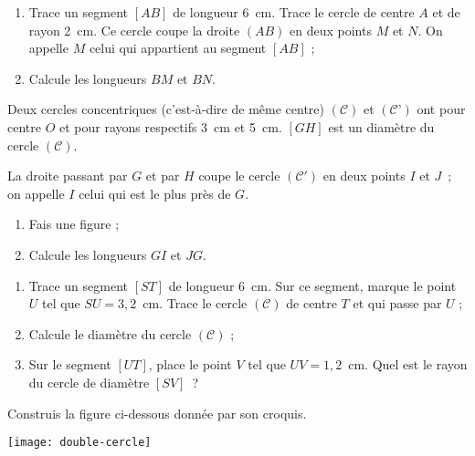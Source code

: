 \begin{exercice}[Calculs]
 \begin{enumerate}
  \item Trace un segment $[AB]$ de longueur 6 cm. Trace le cercle de centre $A$ et de rayon 2 cm. Ce cercle coupe la droite $(AB)$ en deux points $M$ et $N$. On appelle $M$ celui qui appartient au segment $[AB]$ ;
  \item Calcule les longueurs $BM$ et $BN$.
 \end{enumerate}
\end{exercice}


\begin{exercice}[Concentriques]
Deux cercles concentriques (c'est‑à‑dire de même centre) $(\mathcal{C})$ et $(\mathcal{C’})$ ont pour centre $O$ et pour rayons respectifs 3 cm et 5 cm. $[GH]$ est un diamètre du cercle $(\mathcal{C})$. 

La droite passant par $G$ et par $H$ coupe le cercle $(\mathcal{C'})$ en deux points $I$ et $J$ ; on appelle $I$ celui qui est le plus près de $G$.
\begin{enumerate}
  \item Fais une figure ;
  \item Calcule les longueurs $GI$ et $JG$.
 \end{enumerate}
\end{exercice}


\begin{exercice}[Calculs]
\begin{enumerate}
  \item Trace un segment $[ST]$ de longueur 6 cm. Sur ce segment, marque le point $U$ tel que $SU = 3,2$ cm. Trace le cercle $(\mathcal{C})$ de centre $T$ et qui passe par $U$ ;
  \item Calcule le diamètre du cercle $(\mathcal{C})$ ;
  \item Sur le segment $[UT]$, place le point $V$ tel que $UV = 1,2$ cm. Quel est le rayon du cercle de diamètre $[SV]$ ?
 \end{enumerate}
\end{exercice}


\begin{exercice}
Construis la figure ci-dessous donnée par son croquis.

\begin{center} \texttt{[image: double-cercle]} \end{center}
\end{exercice}


